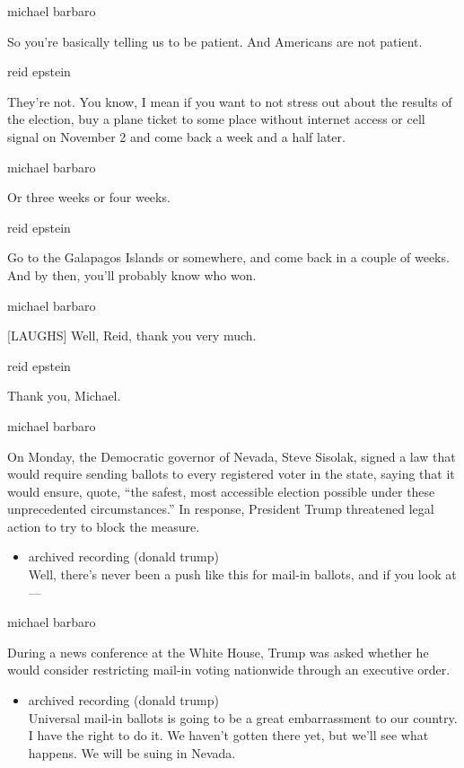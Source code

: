 michael barbaro

So you're basically telling us to be patient. And Americans are not
patient.

reid epstein

They're not. You know, I mean if you want to not stress out about the
results of the election, buy a plane ticket to some place without
internet access or cell signal on November 2 and come back a week and a
half later.

michael barbaro

Or three weeks or four weeks.

reid epstein

Go to the Galapagos Islands or somewhere, and come back in a couple of
weeks. And by then, you'll probably know who won.

michael barbaro

{[}LAUGHS{]} Well, Reid, thank you very much.

reid epstein

Thank you, Michael.

michael barbaro

On Monday, the Democratic governor of Nevada, Steve Sisolak, signed a
law that would require sending ballots to every registered voter in the
state, saying that it would ensure, quote, ``the safest, most accessible
election possible under these unprecedented circumstances.'' In
response, President Trump threatened legal action to try to block the
measure.

\begin{itemize}
\tightlist
\item
  archived recording (donald trump)\\
  Well, there's never been a push like this for mail-in ballots, and if
  you look at ---
\end{itemize}

michael barbaro

During a news conference at the White House, Trump was asked whether he
would consider restricting mail-in voting nationwide through an
executive order.

\begin{itemize}
\tightlist
\item
  archived recording (donald trump)\\
  Universal mail-in ballots is going to be a great embarrassment to our
  country. I have the right to do it. We haven't gotten there yet, but
  we'll see what happens. We will be suing in Nevada.
\end{itemize}

